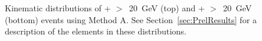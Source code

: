 \documentclass[12pt,twoside,letterpaper,doublespace]{article}
\begin{document}
\begin{figure}[h!]
\label{fig:pjMetSetOne}
\end{figure}
\clearpage

\begin{figure}[h!]
\centering
\caption[Method A \phoonejet]{Kinematic distributions of \phoonejet + \met$>$~20~GeV (top) and \photwojet + \met$>$~20~GeV (bottom) events using Method A. See Section~\ref{sec:PrelResults} for a description of the elements in these distributions.}
\subfigure[]

\end{figure}
\end{document}
